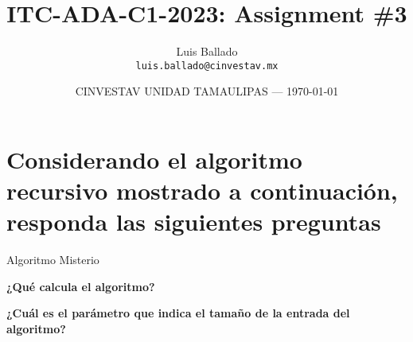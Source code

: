 \documentclass{article}
\title{ITC-ADA-C1-2023: Assignment \#3} %
\author{Luis Ballado\\ \texttt{luis.ballado@cinvestav.mx}} %
\date{CINVESTAV UNIDAD TAMAULIPAS --- \today} %
\begin{document}
\maketitle %


\section{Considerando el algoritmo recursivo mostrado a continuación, responda las siguientes preguntas}

\begin{center}
  \begin{minipage}{0.7\linewidth} %
    \begin{algorithm}[H] 
      \DontPrintSemicolon
      \caption{Algoritmo Misterio}
      \label{alg:loop}
    \end{algorithm}
  \end{minipage}
\end{center}

\begin{question}
  \textbf{¿Qué calcula el algoritmo?}
  
  \textit{}
    
\end{question}

\begin{question}
  \textbf{¿Cuál es el parámetro que indica el tamaño de la entrada del algoritmo?}
  \textit{}
    
\end{question}
\end{document}
